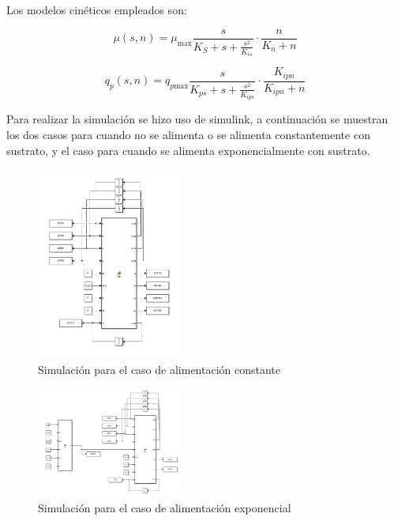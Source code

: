 \documentclass[letterpaper, 10 pt, conference]{ieeeconf}  %
\begin{document}
\vspace{1cm}

Los modelos cinéticos empleados son:

\begin{equation*}
\mu(s,n) = \mu_{\text{max}} \frac{s}{K_S + s + \frac{s^2}{K_{is}}} \cdot \frac{n}{K_n + n}
\end{equation*}

\begin{equation*}
q_p(s,n) = q_{p\text{max}} \frac{s}{K_{ps} + s + \frac{s^2}{K_{ips}}} \cdot \frac{K_{ipn}}{K_{ipn} + n}
\end{equation*}

Para realizar la simulación se hizo uso de simulink, a continuación se muestran los dos casos para cuando no se alimenta o se alimenta constantemente con sustrato, y el caso para cuando se alimenta exponencialmente con sustrato.

\begin{figure}[H]
  \centering
  \includegraphics[width=0.43\textwidth]{./Images_tp1/simulink1.png}
  \caption{Simulación para el caso de alimentación constante}
  \label{fig:simulink1}
\end{figure}
\begin{figure}[H]
  \centering
  \includegraphics[width=0.43\textwidth]{./Images_tp1/simulink2.png}
  \caption{Simulación para el caso de alimentación exponencial}
  \label{fig:simulink2}
\end{figure}
\end{document}

